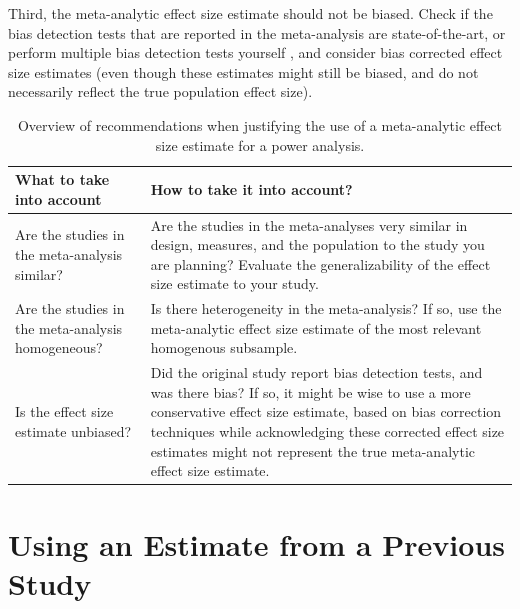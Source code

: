 \documentclass[
  oneside]{krantz}
\begin{document}
Third, the meta-analytic effect size estimate should not be biased. Check if the bias detection tests that are reported in the meta-analysis are state-of-the-art, or perform multiple bias detection tests yourself \citep{carter_correcting_2019}, and consider bias corrected effect size estimates (even though these estimates might still be biased, and do not necessarily reflect the true population effect size).

\begin{table}

\caption{\label{tab:tablemetajust}Overview of recommendations when justifying the use of a meta-analytic effect size estimate for a power analysis.}
\centering
\begin{tabular}[t]{>{\raggedright\arraybackslash}p{5cm}|>{\raggedright\arraybackslash}p{10cm}}
\hline
What to take into account & How to take it into account?\\
\hline
Are the studies in the meta-analysis similar? & Are the studies in the meta-analyses very similar in design, measures, and the population to the study you are planning? Evaluate the generalizability of the effect size estimate to your study.\\
\hline
Are the studies in the meta-analysis homogeneous? & Is there heterogeneity in the meta-analysis? If so, use the meta-analytic effect size estimate of the most relevant homogenous subsample.\\
\hline
Is the effect size estimate unbiased? & Did the original study report bias detection tests, and was there bias? If so, it might be wise to use a more conservative effect size estimate, based on bias correction techniques while acknowledging these corrected effect size estimates might not represent the true meta-analytic effect size estimate.\\
\hline
\end{tabular}
\end{table}

\hypertarget{using-an-estimate-from-a-previous-study}{%
\section{Using an Estimate from a Previous Study}\label{using-an-estimate-from-a-previous-study}}
\end{document}
